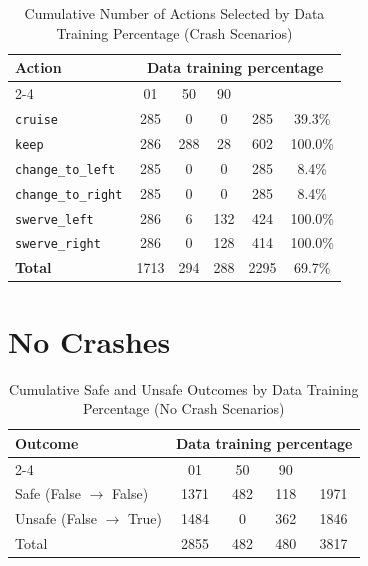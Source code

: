 \documentclass{article}
\begin{document}
\begin{table}[h]
\centering
\caption{Cumulative Number of Actions Selected by Data Training Percentage (Crash Scenarios)}
\begin{tabular}{l|ccc|c|c}
\toprule
\multirow{2}{*}{Action} & \multicolumn{5}{c|}{Data training percentage} & \multirow{2}{*}{Total} & \multirow{2}{*}{Safe (\%)} \\
\cmidrule{2-4}
 & 01 & 50 & 90 & & \\
\midrule
\texttt{cruise} & 285 & 0 & 0 & 285 & 39.3\% \\ 
\texttt{keep} & 286 & 288 & 28 & 602 & 100.0\% \\ 
\texttt{change\_to\_left} & 285 & 0 & 0 & 285 & 8.4\% \\ 
\texttt{change\_to\_right} & 285 & 0 & 0 & 285 & 8.4\% \\ 
\texttt{swerve\_left} & 286 & 6 & 132 & 424 & 100.0\% \\ 
\texttt{swerve\_right} & 286 & 0 & 128 & 414 & 100.0\% \\ 
\midrule
\textbf{Total} & 1713 & 294 & 288 & 2295 & 69.7\% \\ 
\bottomrule
\end{tabular}
\end{table}

\pagebreak
\section{No Crashes}

\begin{table}[h]
\centering
\caption{Cumulative Safe and Unsafe Outcomes by Data Training Percentage (No Crash Scenarios)}
\begin{tabular}{l|ccc|c}
\toprule
\multirow{2}{*}{Outcome} & \multicolumn{5}{c|}{Data training percentage} & \multirow{2}{*}{Total} \\
\cmidrule{2-4}
 & 01 & 50  & 90 & \\
\midrule
Safe (False $\rightarrow$ False) & 1371 & 482 & 118 & 1971 \\ 
Unsafe (False $\rightarrow$ True) & 1484 & 0 & 362 & 1846 \\ 
\midrule
Total & 2855 & 482 & 480 & 3817 \\ 
\bottomrule
\end{tabular}
\end{table}
\end{document}
